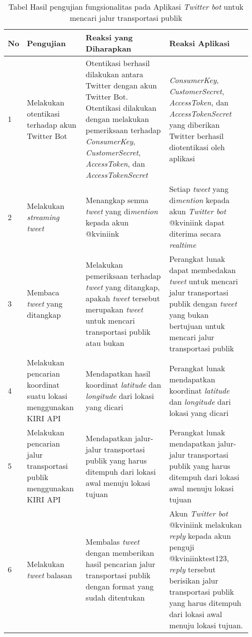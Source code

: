 \begin{table}[h]
		\begin{tabular}{|p{0.5cm}|p{3cm}|p{5cm}|p{5cm}|}
			\hline
				No & Pengujian & Reaksi yang Diharapkan & Reaksi Aplikasi  \\ \hline
				1 & Melakukan otentikasi terhadap akun Twitter Bot & Otentikasi berhasil dilakukan antara Twitter dengan akun Twitter Bot. Otentikasi dilakukan dengan melakukan pemeriksaan terhadap \textit{ConsumerKey}, \textit{CustomerSecret}, \textit{AccessToken}, dan \textit{AccessTokenSecret} &  \textit{ConsumerKey}, \textit{CustomerSecret}, \textit{AccessToken}, dan \textit{AccessTokenSecret} yang diberikan Twitter berhasil diotentikasi oleh aplikasi \\ \hline
				2 & Melakukan \textit{streaming tweet} & Menangkap semua \textit{tweet} yang di\textit{mention} kepada akun @kviniink & Setiap \textit{tweet} yang di\textit{mention} kepada akun \textit{Twitter bot} @kviniink dapat diterima secara \textit{realtime}\\ \hline
				3 & Membaca \textit{tweet} yang ditangkap & Melakukan pemeriksaan terhadap \textit{tweet} yang ditangkap, apakah \textit{tweet} tersebut merupakan \textit{tweet} untuk mencari transportasi publik atau bukan & Perangkat lunak dapat membedakan \textit{tweet} untuk mencari jalur transportasi publik dengan \textit{tweet} yang bukan bertujuan untuk mencari jalur transportasi publik  \\ \hline
				4 & Melakukan pencarian koordinat suatu lokasi menggunakan KIRI API & Mendapatkan hasil koordinat \textit{latitude} dan \textit{longitude} dari lokasi yang dicari & Perangkat lunak mendapatkan koordinat \textit{latitude} dan \textit{longitude} dari lokasi yang dicari  \\ \hline
				5 & Melakukan pencarian jalur transportasi publik menggunakan KIRI API & Mendapatkan jalur-jalur transportasi publik yang harus ditempuh dari lokasi awal menuju lokasi tujuan &  Perangkat lunak mendapatkan jalur-jalur transportasi publik yang harus ditempuh dari lokasi awal menuju lokasi tujuan \\ \hline
				6 & Melakukan \textit{tweet} balasan & Membalas \textit{tweet} dengan memberikan hasil pencarian jalur transportasi publik dengan format yang sudah ditentukan &  Akun \textit{Twitter bot} @kviniink melakukan \textit{reply} kepada akun penguji @kviniinktest123, \textit{reply} tersebut berisikan jalur transportasi publik yang harus ditempuh dari lokasi awal menuju lokasi tujuan.\\ \hline
		\end{tabular}
	\caption{Tabel Hasil pengujian fungsionalitas pada Aplikasi \textit{Twitter bot} untuk mencari jalur transportasi publik}
	\label{tab:TabelHasilPengujianFungsionalitasPadaAplikasiTwitterBotUntukMencariJalurTransportasiPublik}
\end{table}

